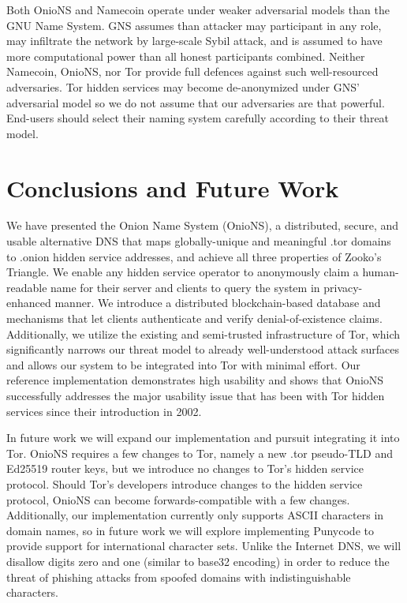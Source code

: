 \documentclass[USenglish,oneside,twocolumn]{article}
\begin{document}
Both OnioNS and Namecoin operate under weaker adversarial models than the GNU Name System. GNS assumes than attacker may participant in any role, may infiltrate the network by large-scale Sybil attack, and is assumed to have more computational power than all honest participants combined. Neither Namecoin, OnioNS, nor Tor provide full defences against such well-resourced adversaries. Tor hidden services may become de-anonymized under GNS' adversarial model so we do not assume that our adversaries are that powerful. End-users should select their naming system carefully according to their threat model.

\section{Conclusions and Future Work}

We have presented the Onion Name System (OnioNS), a distributed, secure, and usable alternative DNS that maps globally-unique and meaningful .tor domains to .onion hidden service addresses, and achieve all three properties of Zooko's Triangle. We enable any hidden service operator to anonymously claim a human-readable name for their server and clients to query the system in privacy-enhanced manner. We introduce a distributed blockchain-based database and mechanisms that let clients authenticate and verify denial-of-existence claims. Additionally, we utilize the existing and semi-trusted infrastructure of Tor, which significantly narrows our threat model to already well-understood attack surfaces and allows our system to be integrated into Tor with minimal effort. Our reference implementation demonstrates high usability and shows that OnioNS successfully addresses the major usability issue that has been with Tor hidden services since their introduction in 2002.

In future work we will expand our implementation and pursuit integrating it into Tor. OnioNS requires a few changes to Tor, namely a new .tor pseudo-TLD and Ed25519 router keys, but we introduce no changes to Tor's hidden service protocol. Should Tor's developers introduce changes to the hidden service protocol, OnioNS can become forwards-compatible with a few changes. Additionally, our implementation currently only supports ASCII characters in domain names, so in future work we will explore implementing Punycode to provide support for international character sets. Unlike the Internet DNS, we will disallow digits zero and one (similar to base32 encoding) in order to reduce the threat of phishing attacks from spoofed domains with indistinguishable characters.
\end{document}
